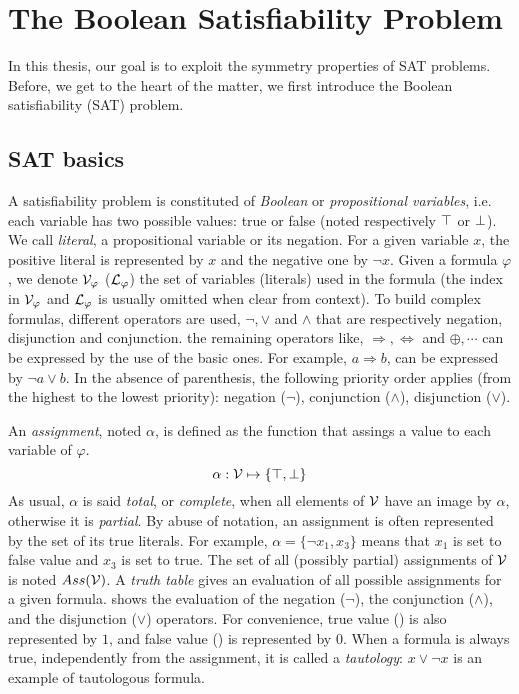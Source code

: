 \chapter{The Boolean Satisfiability Problem}\label{chap:preliminaries}
\minitoc
In this thesis, our goal is to exploit the symmetry properties of SAT problems.
Before, we get to the heart of the matter, we first introduce the Boolean satisfiability (SAT)  problem.

\section{SAT basics}
A satisfiability problem is constituted of \emph{Boolean} or \emph{propositional variables},
i.e. each variable has two possible values: true or false (noted respectively $\top$ or $\bot$).
We call \emph{literal}, a propositional variable or its negation.
For a given variable $x$, the positive literal is represented by $x$ and the negative one by $\neg x$.
Given a formula $\varphi$, we denote $\mathcal{V}_\varphi$ ($\mathcal{L}_\varphi$) the set of variables (literals) used in the formula (the index in $\mathcal{V}_\varphi$ and $\mathcal{L}_\varphi$ is usually omitted when
clear from context).
To build complex formulas, different operators are used, $\neg, \lor$ and $\land$ that are respectively negation, disjunction and conjunction. the remaining operators like, $\Rightarrow, \Leftrightarrow$ and
$\oplus, \cdots$ can be expressed by the use of the basic ones.
For example, $a \Rightarrow b$, can be expressed by $ \neg a \lor b$.
In the absence of parenthesis, the following priority order applies (from the highest to the lowest priority):
negation ($\neg$), conjunction ($\land$), disjunction ($\lor$).

An \emph{assignment}, noted $\alpha$, is defined as the function that assings a value to each variable of $\varphi$.
 $$\alpha: \mathcal{V} \mapsto \{ \top, \bot \}$$
 As usual, $\alpha$ is said \emph{total}, or \emph{complete}, when all elements of $\mathcal{V}$ have an image by
$\alpha$, otherwise it is \emph{partial}. By abuse of notation, an assignment is
often represented by the set of its true literals. For example, $\alpha = \{\neg x_1, x_3 \}$ means that $x_1$
is set to false value and $x_3$ is set to true.
  The set of all (possibly partial) assignments of $\mathcal{V}$ is noted $Ass(\mathcal{V})$.
A \emph{truth table} gives an evaluation of all possible assignments for a given formula.
 shows the evaluation of the negation ($\neg$), the conjunction ($\land$), and the disjunction ($\lor$) operators.
For convenience, true value (\true) is also represented by $1$, and false value (\false) is represented by $0$.
When a formula is always true, independently from the assignment, it is called a \emph{tautology}: $x \lor \neg x$ is 
an example of tautologous formula.


